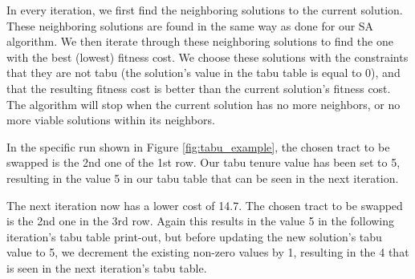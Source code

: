 \documentclass[journal]{IEEEtran}
\begin{document}
In every iteration, we first find the neighboring solutions to the current solution. These neighboring solutions are found in the same way as done for our SA algorithm. We then iterate through these neighboring solutions to find the one with the best (lowest) fitness cost. We choose these solutions with the constraints that they are not tabu (the solution's value in the tabu table is equal to 0), and that the resulting fitness cost is better than the current solution's fitness cost. The algorithm will stop when the current solution has no more neighbors, or no more viable solutions within its neighbors.

In the specific run shown in Figure \ref{fig:tabu_example}, the chosen tract to be swapped is the 2nd one of the 1st row. Our tabu tenure value has been set to 5, resulting in the value 5 in our tabu table that can be seen in the next iteration.

The next iteration now has a lower cost of 14.7. The chosen tract to be swapped is the 2nd one in the 3rd row. Again this results in the value 5 in the following iteration's tabu table print-out, but before updating the new solution's tabu value to 5, we decrement the existing non-zero values by 1, resulting in the 4 that is seen in the next iteration's tabu table. 
 \\
\end{document}
